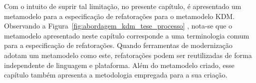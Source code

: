%



Com o intuito de suprir tal limitação, no presente capítulo, é apresentado um metamodelo para a especificação de refatorações para o metamodelo KDM. Observando a Figura~\ref{fig:abordagem_kdm_tese_processo} , nota-se que o metamodelo  apresentado neste capítulo corresponde a uma terminologia comum para a especificação de refatorações. Quando ferramentas de modernização adotam um metamodelo como este, refatorações podem ser reutilizadas de forma independente de linguagem e plataforma. Além do metamodelo criado, esse capítulo também apresenta a metodologia empregada para a sua criação. %

